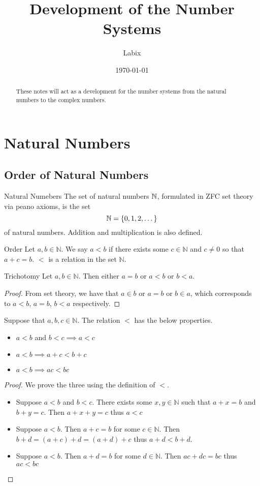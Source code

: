 \documentclass[a4paper]{article}
\title{Development of the Number Systems}
\author{Labix}
\date{\today}
\begin{document}
\maketitle
\begin{abstract}
These notes will act as a development for the number systems from the natural numbers to the complex numbers. 
\end{abstract}
\pagebreak
\tableofcontents
\pagebreak
\section{Natural Numbers}
\subsection{Order of Natural Numbers}
\begin{defn}{Natural Numebers}{} The set of natural numbers $\mathbb{N}$, formulated in ZFC set theory via peano axioms, is the set $$\mathbb{N}=\{0,1,2,\dots\}$$ of natural numbers. Addition and multiplication is also defined. 
\end{defn}

\begin{defn}{Order}{} Let $a,b\in\mathbb{N}$. We say $a<b$ if there exists some $c\in\mathbb{N}$ and $c\neq0$ so that $a+c=b$. $<$ is a relation in the set $\mathbb{N}$. 
\end{defn}

\begin{prp}{Trichotomy}{} Let $a,b\in\mathbb{N}$. Then either $a=b$ or $a<b$ or $b<a$. 
\end{prp}
\begin{proof} From set theory, we have that $a\in b$ or $a=b$ or $b\in a$, which corresponds to $a<b$, $a=b$, $b<a$ respectively. 
\end{proof}

\begin{prp}{}{} Suppose that $a,b,c\in\mathbb{N}$. The relation $<$ has the below properties. 
\begin{itemize}
\item $a<b$ and $b<c\implies a<c$
\item $a<b\implies a+c<b+c$
\item $a<b\implies ac<bc$
\end{itemize}
\end{prp}
\begin{proof} We prove the three using the definition of $<$. 
\begin{itemize}
\item Suppose $a<b$ and $b<c$. There exists some $x,y\in\mathbb{N}$ such that $a+x=b$ and $b+y=c$. Then $a+x+y=c$ thus $a<c$
\item Suppose $a<b$. Then $a+c=b$ for some $c\in\mathbb{N}$. Then $b+d=(a+c)+d=(a+d)+c$ thus $a+d<b+d$. 
\item Suppose $a<b$. Then $a+d=b$ for some $d\in\mathbb{N}$. Then $ac+dc=bc$ thus $ac<bc$
\end{itemize}
\end{proof}
\end{document}
